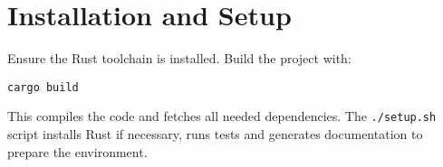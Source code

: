 \chapter{Installation and Setup}
Ensure the Rust toolchain is installed. Build the project with:
\begin{verbatim}
cargo build
\end{verbatim}
This compiles the code and fetches all needed dependencies. The \texttt{./setup.sh} script installs Rust if necessary, runs tests and generates documentation to prepare the environment.
